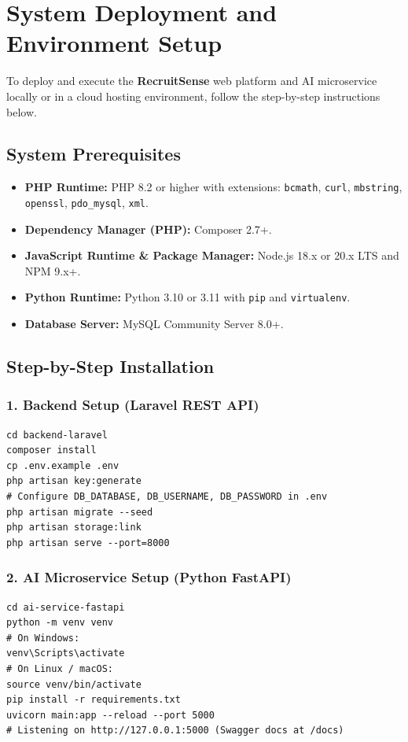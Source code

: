 \section{System Deployment and Environment Setup}
To deploy and execute the \textbf{RecruitSense} web platform and AI microservice locally or in a cloud hosting environment, follow the step-by-step instructions below.

\subsection{System Prerequisites}
\begin{itemize}
    \item \textbf{PHP Runtime:} PHP 8.2 or higher with extensions: \texttt{bcmath}, \texttt{curl}, \texttt{mbstring}, \texttt{openssl}, \texttt{pdo\_mysql}, \texttt{xml}.
    \item \textbf{Dependency Manager (PHP):} Composer 2.7+.
    \item \textbf{JavaScript Runtime \& Package Manager:} Node.js 18.x or 20.x LTS and NPM 9.x+.
    \item \textbf{Python Runtime:} Python 3.10 or 3.11 with \texttt{pip} and \texttt{virtualenv}.
    \item \textbf{Database Server:} MySQL Community Server 8.0+.
\end{itemize}

\subsection{Step-by-Step Installation}
\subsubsection{1. Backend Setup (Laravel REST API)}
\begin{verbatim}
cd backend-laravel
composer install
cp .env.example .env
php artisan key:generate
# Configure DB_DATABASE, DB_USERNAME, DB_PASSWORD in .env
php artisan migrate --seed
php artisan storage:link
php artisan serve --port=8000
\end{verbatim}

\subsubsection{2. AI Microservice Setup (Python FastAPI)}
\begin{verbatim}
cd ai-service-fastapi
python -m venv venv
# On Windows:
venv\Scripts\activate
# On Linux / macOS:
source venv/bin/activate
pip install -r requirements.txt
uvicorn main:app --reload --port 5000
# Listening on http://127.0.0.1:5000 (Swagger docs at /docs)
\end{verbatim}

